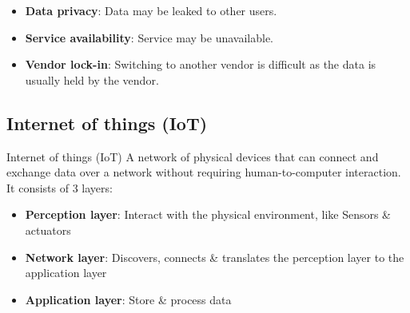 \begin{itemize}
    \item \textbf{Data privacy}: Data may be leaked to other users.
    \item \textbf{Service availability}: Service may be unavailable.
    \item \textbf{Vendor lock-in}: Switching to another vendor is difficult as the data is usually held by the vendor.
\end{itemize}

\subsection{Internet of things (IoT)}
\begin{definition}
    {Internet of things (IoT)}
    A network of physical devices that can connect and exchange data over a network without requiring human-to-computer interaction. It consists of 3 layers:
    \begin{itemize}
        \item \textbf{Perception layer}: Interact with the physical environment, like Sensors \& actuators
        \item \textbf{Network layer}: Discovers, connects \& translates the perception layer to the application layer
        \item \textbf{Application layer}: Store \& process data
    \end{itemize}
\end{definition}
